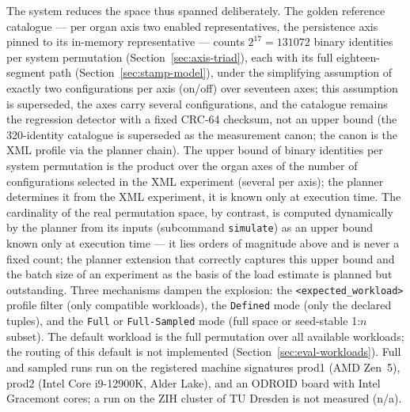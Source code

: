 \begin{nurkurz}
The system reduces the space thus spanned deliberately. The golden reference catalogue --- per organ
axis two enabled representatives, the persistence axis pinned to its in-memory representative --- counts
$2^{17} = 131072$ binary identities per system permutation (Section~\ref{sec:axis-triad}), each with its
full eighteen-segment path (Section~\ref{sec:stamp-model}), under the simplifying assumption of exactly two
configurations per axis (on/off) over seventeen axes; this assumption is superseded, the axes carry several
configurations, and the catalogue remains the regression detector with a fixed CRC-64 checksum, not an upper
bound (the 320-identity catalogue is superseded as the measurement canon; the canon is the XML profile via the
planner chain). The upper bound of binary identities per system permutation is the product over the organ
axes of the number of configurations selected in the XML experiment (several per axis); the planner
determines it from the XML experiment, it is known only at execution time. The cardinality of the real
permutation space, by contrast, is computed dynamically by the planner from its inputs (subcommand
\texttt{simulate}) as an upper bound known only at execution time --- it lies orders of magnitude above and
is never a fixed count; the planner extension that correctly captures this upper bound and the batch size of
an experiment as the basis of the load estimate is planned but outstanding. Three mechanisms dampen the explosion: the
\texttt{<expected\_workload>} profile filter (only compatible workloads), the \texttt{Defined} mode
(only the declared tuples), and the \texttt{Full} or \texttt{Full-Sampled} mode (full space or
seed-stable 1:$n$ subset). The default workload is the full permutation over all available workloads;
the routing of this default is not implemented (Section~\ref{sec:eval-workloads}). Full and sampled
runs run on the registered machine signatures prod1 (AMD Zen~5), prod2 (Intel Core i9-12900K, Alder
Lake), and an ODROID board with Intel Gracemont cores; a run on the ZIH cluster of TU Dresden is not
measured (n/a).
\end{nurkurz}

